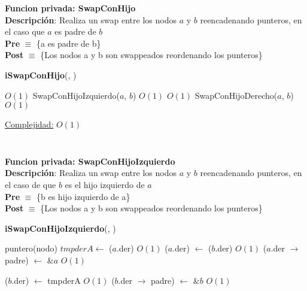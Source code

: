 \begin{Algoritmos}
$ $\newline

\textbf{Funcion privada: SwapConHijo}\\
\textbf{Descripci\'on}: Realiza un swap entre los nodos $a$ y $b$ reencadenando punteros, en el caso que $a$ es padre de $b$\\ 
\textbf{Pre} $\equiv$ \{a es padre de b\}\\%
\textbf{Post} $\equiv$ \{Los nodos a y b son swappeados reordenando los punteros\}%
\begin{algorithm}[H]
{\textbf{iSwapConHijo}(, )}
\begin{algorithmic}[1]

     \Comment $O(1)$
        \State SwapConHijoIzquierdo($a$, $b$) \Comment $O(1)$
    \Else {} \Comment $O(1)$
            \State SwapConHijoDerecho($a$, $b$) \Comment $O(1)$
        \EndIf 
    \EndIf 

    \medskip
    \Statex \underline{Complejidad:} $O(1)$

\end{algorithmic}
\end{algorithm}

$ $\newline



$ $\newline

\textbf{Funcion privada: SwapConHijoIzquierdo}\\
\textbf{Descripci\'on}: Realiza un swap entre los nodos $a$ y $b$ reencadenando punteros, en el caso de que $b$ es el hijo izquierdo de $a$\\ 
\textbf{Pre} $\equiv$ \{b es hijo izquierdo de a\}\\%
\textbf{Post} $\equiv$ \{Los nodos a y b son swappeados reordenando los punteros\}%
\begin{algorithm}[H]
{\textbf{iSwapConHijoIzquierdo}(, )}
\begin{algorithmic}[1]

    \State puntero(nodo) $tmpderA \gets$ ($a$.der) \Comment $O(1)$
    \State ($a$.der) $\gets$ ($b$.der)  \Comment $O(1)$
        \State ($a$.der $\to$ padre) $\gets$ $\&a$ \Comment $O(1)$
    \EndIf

    \State ($b$.der) $\gets$ tmpderA  \Comment $O(1)$
        \State ($b$.der $\to$ padre) $\gets$ $\&b$  \Comment $O(1)$
    \EndIf
    

\end{algorithmic}
\end{algorithm}
\end{Algoritmos}
